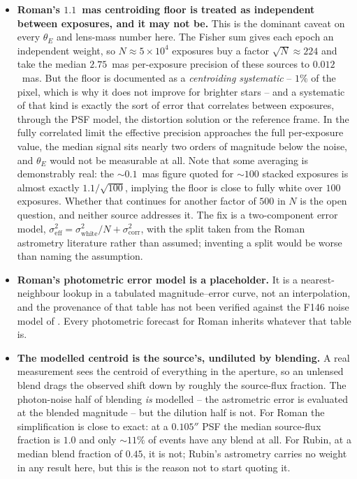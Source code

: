 \documentclass[english,10pt,a4paper]{article}
\begin{document}
	\begin{itemize}
		\item \textbf{Roman's $1.1$~mas centroiding floor is treated as independent between exposures, and it may not be.} This is the dominant caveat on every $\theta_E$ and lens-mass number here. The Fisher sum gives each epoch an independent weight, so $N\approx5\times10^{4}$ exposures buy a factor $\sqrt{N}\approx224$ and take the median $2.75$~mas per-exposure precision of these sources to $0.012$~mas. But the floor is documented as a \emph{centroiding systematic} -- $1\%$ of the pixel, which is why it does not improve for brighter stars -- and a systematic of that kind is exactly the sort of error that correlates between exposures, through the PSF model, the distortion solution or the reference frame. In the fully correlated limit the effective precision approaches the full per-exposure value, the median signal sits nearly two orders of magnitude below the noise, and $\theta_E$ would not be measurable at all. Note that some averaging is demonstrably real: the $\sim$$0.1$~mas figure quoted for $\sim$$100$ stacked exposures \cite{Sanderson2019WFIRSTastrometry} is almost exactly $1.1/\sqrt{100}$, implying the floor is close to fully white over $100$ exposures. Whether that continues for another factor of $500$ in $N$ is the open question, and neither source addresses it. The fix is a two-component error model, $\sigma_{\mathrm{eff}}^2 = \sigma_{\mathrm{white}}^2/N + \sigma_{\mathrm{corr}}^2$, with the split taken from the Roman astrometry literature rather than assumed; inventing a split would be worse than naming the assumption.

		\item \textbf{Roman's photometric error model is a placeholder.} It is a nearest-neighbour lookup in a tabulated magnitude--error curve, not an interpolation, and the provenance of that table has not been verified against the F146 noise model of \cite{Wilson2023GBTDS}. Every photometric forecast for Roman inherits whatever that table is.

		\item \textbf{The modelled centroid is the source's, undiluted by blending.} A real measurement sees the centroid of everything in the aperture, so an unlensed blend drags the observed shift down by roughly the source-flux fraction. The photon-noise half of blending \emph{is} modelled -- the astrometric error is evaluated at the blended magnitude -- but the dilution half is not. For Roman the simplification is close to exact: at a $0.105''$ PSF the median source-flux fraction is $1.0$ and only $\sim$$11\%$ of events have any blend at all. For Rubin, at a median blend fraction of $0.45$, it is not; Rubin's astrometry carries no weight in any result here, but this is the reason not to start quoting it.


\end{itemize}
\end{document}
